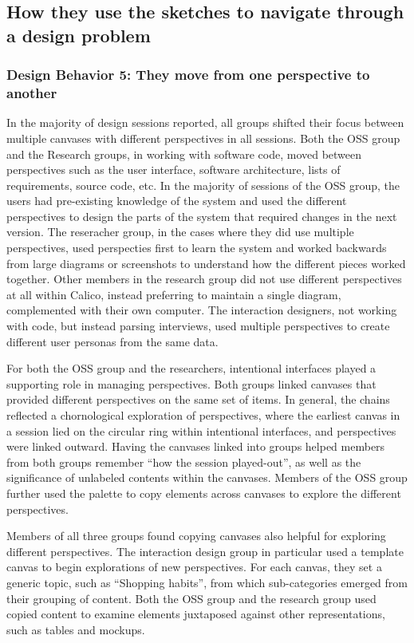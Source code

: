 \subsection{How they use the sketches to navigate through a design problem}

\subsubsection{Design Behavior 5: They move from one perspective to another}

In the majority of design sessions reported, all groups shifted their focus between multiple canvases with different perspectives in all sessions. Both the OSS group and the Research groups, in working with software code, moved between perspectives such as the user interface, software architecture, lists of requirements, source code, etc. In the majority of sessions of the OSS group, the users had pre-existing knowledge of the system and used the different perspectives to design the parts of the system that required changes in the next version. The reseracher group, in the cases where they did use multiple perspectives, used perspecties first to learn the system and worked backwards from large diagrams or screenshots to understand how the different pieces worked together. Other members in the research group did not use different perspectives at all within Calico, instead preferring to maintain a single diagram, complemented with their own computer. The interaction designers, not working with code, but instead parsing interviews, used multiple perspectives to create different user personas from the same data. 

For both the OSS group and the researchers, intentional interfaces played a supporting role in managing perspectives. Both groups linked canvases that provided different perspectives on the same set of items. In general, the chains reflected a chornological exploration of perspectives, where the earliest canvas in a session lied on the circular ring within intentional interfaces, and perspectives were linked outward. Having the canvases linked into groups helped members from both groups remember ``how the session played-out'', as well as the significance of unlabeled contents within the canvases. Members of the OSS group further used the palette to copy elements across canvases to explore the different perspectives.

Members of all three groups found copying canvases also helpful for exploring different perspectives. The interaction design group in particular used a template canvas to begin explorations of new perspectives. For each canvas, they set a generic topic, such as ``Shopping habits'', from which sub-categories emerged from their grouping of content. Both the OSS group and the research group used copied content to examine elements juxtaposed against other representations, such as tables and mockups.

